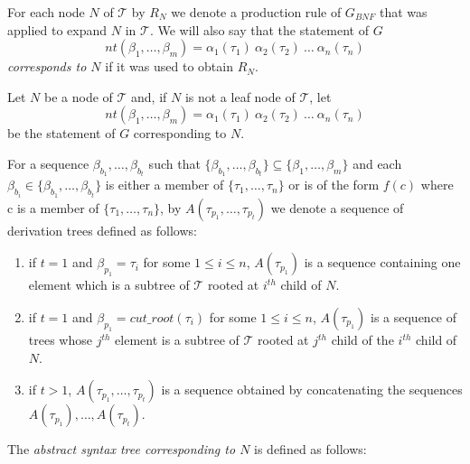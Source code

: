 \documentclass[a4paper,10pt]{article}
\begin{document}
For each node $N$ of $\mathcal{T}$ by $R_{N}$ we denote a production rule of $G_{BNF}$  that was applied to expand $N$ in $\mathcal{T}$.
We will also say that the statement of $G$ 
$$nt(\beta_1,\ldots,\beta_m) = \alpha_1(\tau_1)~\alpha_2(\tau_2)~\ldots~\alpha_n(\tau_n)$$
\textit{corresponds to $N$}  if it was used to obtain $R_{N}$.


Let $N$ be a node of $\mathcal{T}$ and, if $N$ is not a leaf node of $\mathcal{T}$, let 
$$nt(\beta_1,\ldots,\beta_m) = \alpha_1(\tau_1)~\alpha_2(\tau_2)~\ldots~\alpha_n(\tau_n)$$
be the statement of $G$ corresponding to $N$.

For a sequence $\beta_{b_1}, \ldots, \beta_{b_t}$ such that $\{\beta_{b_1}, \ldots, \beta_{b_t}\} \subseteq \{\beta_1,\ldots, \beta_m\}$ and each $\beta_{b_i} \in \{\beta_{b_1}, \ldots, \beta_{b_t}\}$ is either a member of $\{\tau_1, \ldots, \tau_n\}$ or is of the form $f(c)$ where c is a member of $\{\tau_1, \ldots, \tau_n\}$, by 
$A(\tau_{p_1}, \ldots, \tau_{p_t})$ we denote a sequence of derivation trees defined as follows: 
\begin{enumerate}
\item if $t=1$ and  $\beta_{p_1} = \tau_i$ for some $1 \le i \le n$, $A(\tau_{p_1})$ is a sequence containing one element which is a subtree of $\mathcal{T}$ rooted at  $i^{th}$ child of $N$.
\item if $t=1$ and  $\beta_{p_1} = cut\_root(\tau_i)$ for some $1 \le i \le n$, $A(\tau_{p_1})$ is a sequence of  trees whose $j^{th}$ element is a subtree of $\mathcal{T}$  rooted at  $j^{th}$ child of the $i^{th}$ child of $N$.
\item if $t>1$,  $A(\tau_{p_1}, \ldots, \tau_{p_t})$ is a sequence obtained by concatenating the sequences $A(\tau_{p_1}),\ldots,A(\tau_{p_t})$.
\end{enumerate} 

The \textit{abstract syntax tree corresponding to $N$} is defined as follows:
\end{document}

